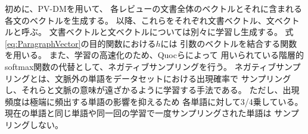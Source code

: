 初めに、PV-DMを用いて、
各レビューの文書全体のベクトルとそれに含まれる各文のベクトルを生成する。
以降、これらをそれぞれ文書ベクトル、文ベクトルと呼ぶ。
文書ベクトルと文ベクトルについては別々に学習し生成する。
式\ref{eq:ParagraphVector}の目的関数における$h$には
引数のベクトルを結合する関数を用いる。
また、学習の高速化のため、Quocら\cite{quoc14}によって
用いられている階層的softmax関数の代替として、ネガティブサンプリングを行う。
ネガティブサンプリングとは、文脈外の単語をデータセットにおける出現確率で
サンプリングし、それらと文脈の意味が遠ざかるように学習する手法である。
ただし、出現頻度は極端に頻出する単語の影響を抑えるため
各単語に対して3/4乗している。
現在の単語と同じ単語や同一回の学習で一度サンプリングされた単語は
サンプリングしない。

